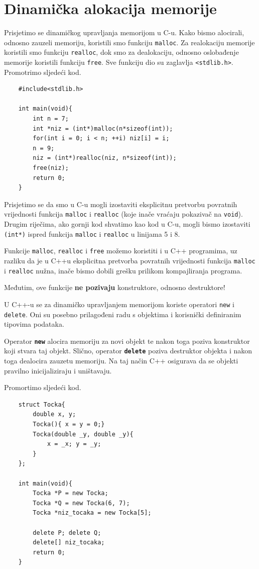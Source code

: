 \section{Dinamička alokacija memorije}
Prisjetimo se dinamičkog upravljanja memorijom u C-u. Kako bismo alocirali, odnosno zauzeli memoriju, koristili smo funkciju \texttt{malloc}. Za realokaciju memorije koristili smo funkciju \texttt{realloc}, dok smo za dealokaciju, odnosno oslobađenje memorije koristili funkciju \texttt{free}. Sve funkciju dio su zaglavlja \texttt{<stdlib.h>}.
Promotrimo sljedeći kod.
\begin{verbatim}
    #include<stdlib.h>

    int main(void){
        int n = 7;
        int *niz = (int*)malloc(n*sizeof(int));
        for(int i = 0; i < n; ++i) niz[i] = i;
        n = 9;
        niz = (int*)realloc(niz, n*sizeof(int));
        free(niz);
        return 0;
    }
\end{verbatim}
Prisjetimo se da smo u C-u mogli izostaviti eksplicitnu pretvorbu povratnih vrijednosti funkcija \texttt{malloc} i \texttt{realloc} (koje inače vraćaju pokazivač na \texttt{void}). Drugim riječima, ako gornji kod shvatimo kao kod u C-u, mogli bismo izostaviti \texttt{(int*)} ispred funkcija \texttt{malloc} i \texttt{realloc} u linijama 5 i 8.

Funkcije \texttt{malloc}, \texttt{realloc} i \texttt{free} možemo koristiti i u C++ programima, uz razliku da je u C++u eksplicitna pretvorba povratnih vrijednosti funkcija \texttt{malloc} i \texttt{realloc} nužna, inače bismo dobili grešku prilikom kompajliranja programa.

Međutim, ove funkcije \textbf{ne pozivaju} konstruktore, odnosno destruktore!

U C++-u se za dinamičko upravljanjem memorijom koriste operatori \texttt{new} i \texttt{delete}. Oni su posebno prilagođeni radu s objektima i korisnički definiranim tipovima podataka. 
 
Operator  \textbf{\texttt{new}} alocira memoriju za novi objekt te nakon toga poziva konstruktor koji stvara taj objekt. Slično, operator \textbf{\texttt{delete}} poziva destruktor objekta i nakon toga dealocira zauzetu memoriju. Na taj način C++ osigurava da se objekti pravilno inicijaliziraju i uništavaju.
 
Promortimo sljedeći kod.
 
 \begin{verbatim}
    struct Tocka{
        double x, y;
        Tocka(){ x = y = 0;}
        Tocka(double _y, double _y){
            x = _x; y = _y;
        }
    };

    int main(void){
        Tocka *P = new Tocka;
        Tocka *Q = new Tocka(6, 7);
        Tocka *niz_tocaka = new Tocka[5];

        delete P; delete Q;
        delete[] niz_tocaka;
        return 0;
    }
 \end{verbatim}
 
